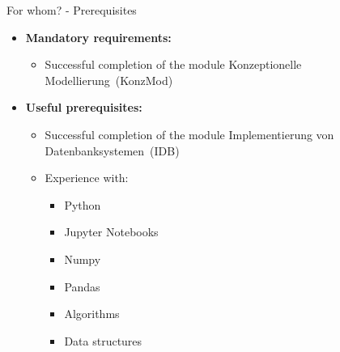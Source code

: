 \begin{frame}{For whom? - Prerequisites}
	\begin{itemize}
		\item \textbf{Mandatory requirements:}
		      \begin{itemize}
			      \item Successful completion of the module \glqq Konzeptionelle Modellierung\grqq~(KonzMod)
		      \end{itemize}
		\item \textbf{Useful prerequisites:}
		      \begin{itemize}
			      \item Successful completion of the module \glqq Implementierung von Datenbanksystemen\grqq~(IDB)
			      \item Experience with:
			            \begin{itemize}
				            \item Python
				            \item Jupyter Notebooks
				            \item Numpy
				            \item Pandas
				            \item Algorithms
				            \item Data structures
			            \end{itemize}
		      \end{itemize}
	\end{itemize}

\end{frame}


